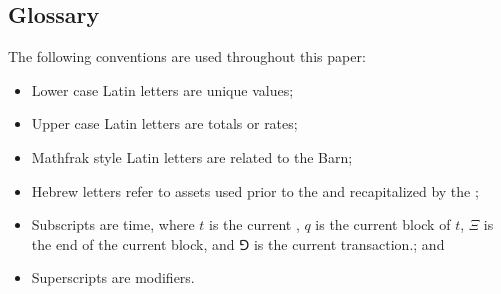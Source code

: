 \documentclass[class=article, crop=false]{standalone}
\begin{document}
\subsection{Glossary}
The following conventions are used throughout this paper:
\begin{itemize}
    \item Lower case Latin letters are unique values;
    \item Upper case Latin letters are totals or rates;
    \item Mathfrak style Latin letters are related to the Barn; 
    \item Hebrew letters refer to assets used prior to the  and recapitalized by the ;
    \item Subscripts are time, where $t$ is the current , $q$ is the current block of $t$, \hypertarget{ht1}{$\Xi$} is the end of the current block, and $\Game$ is the current transaction.; and
    \item Superscripts are modifiers.
\end{itemize}
\end{document}
